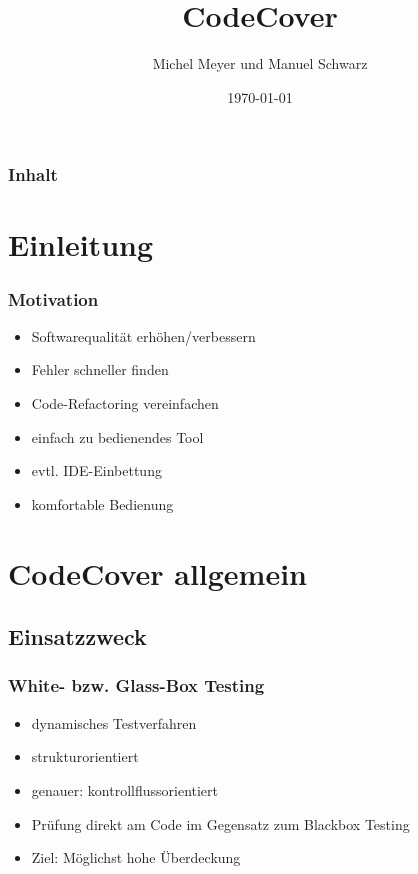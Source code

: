 \documentclass{beamer}
\begin{document}
  \title[CodeCover\hspace{105mm}\insertframenumber/\inserttotalframenumber]{CodeCover}
  \author{Michel Meyer und Manuel Schwarz}
  \date{\today}

  \begin{frame}
    \titlepage
  \end{frame}

  \begin{frame}
    \frametitle{Inhalt}
    \tableofcontents
  \end{frame}


  \section{Einleitung}
  \begin{frame}
    \frametitle{Motivation}
    \begin{itemize}[<+->]
      \item Softwarequalität erhöhen/verbessern
      \item Fehler schneller finden
      \item Code-Refactoring vereinfachen
      \item einfach zu bedienendes Tool
      \item evtl. IDE-Einbettung
      \item komfortable Bedienung
    \end{itemize}
  \end{frame}


  \section{CodeCover allgemein}
  \subsection{Einsatzzweck}
  \begin{frame}\frametitle{White- bzw. Glass-Box Testing}
    \begin{itemize}[<+->]
      \item dynamisches Testverfahren
      \item strukturorientiert
      \item genauer: kontrollflussorientiert
      \item Prüfung direkt am Code im Gegensatz zum Blackbox Testing
      \item Ziel: Möglichst hohe Überdeckung
    \end{itemize}
  \end{frame}
\end{document}
